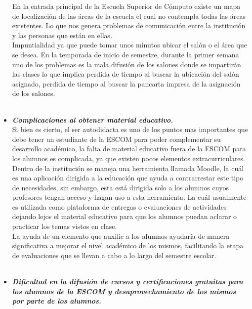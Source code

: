 \begin{itemize}
		En la entrada principal de la Escuela Superior de Cómputo existe un mapa de localización de las áreas de la escuela el cual no contempla todas las áreas existentes.  Lo que nos genera problemas de comunicación entre la institución y las personas que están en ellas. \\ Impuntialidad ya que puede tomar unos minutos ubicar el salón o el área que se desea. En la temporada de inicio de semestre, durante la primer semana uno de los problemas es la mala difusión de los salones donde se impartirán las clases lo que implica perdida de tiempo al buscar la ubicación del salón asignado, perdida de tiempo al buscar la pancarta impresa de la asignación de los salones.\\ \\
		
		\item \textbf{\textit{Complicaciones al obtener material educativo.}} \\
		
		Si bien es cierto, el ser autodidacta es uno de los puntos mas importantes que debe tener un estudiante de la ESCOM para poder complementar su desarrollo académico, la falta de material educativo fuera de la ESCOM para los alumnos es complicada, ya que existen pocos elementos extracurriculares.\\
		
		Dentro de la institución se maneja una herramienta llamada Moodle, la cuál es una aplicación dirigida a la educación que ayuda a contrarrestar este tipo de necesidades, sin embargo, esta está dirigida solo a los alumnos cuyos profesores tengan acceso y hagan uso a esta herramienta. La cuál usualmente es utilizada como plataforma de entregas o evaluaciones de actividades dejando lejos el material educativo para que los alumnos puedan aclarar o practicar los temas vistos en clase. \\
		
		La ayuda de un elemento que auxilie a los alumnos ayudaría de manera significativa a mejorar el nivel académico de los mismos, facilitando la etapa de evaluaciones que se llevan a cabo a lo largo del semestre escolar.\\ \\
		
		\item \textbf{\textit{Dificultad en la  difusión de cursos y certificaciones gratuitas para los alumnos de la ESCOM y desaprovechamiento de los mismos por parte de los alumnos.}}\\
		

\end{itemize}
